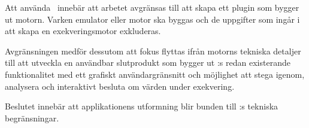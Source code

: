 Att använda \stoe\ innebär att arbetet avgränsas till att skapa ett plugin som
bygger ut motorn. Varken emulator eller motor ska byggas och de uppgifter som
ingår i att skapa en exekveringsmotor exkluderas.

Avgränsningen medför dessutom att fokus flyttas ifrån motorns tekniska detaljer
till att utveckla en användbar slutprodukt som bygger ut \stoe:s redan
existerande funktionalitet med ett grafiskt användargränsnitt och möjlighet att
stega igenom, analysera och interaktivt besluta om värden under exekvering.

Beslutet innebär att applikationens utformning blir bunden till \stoe:s tekniska
begränsningar.
